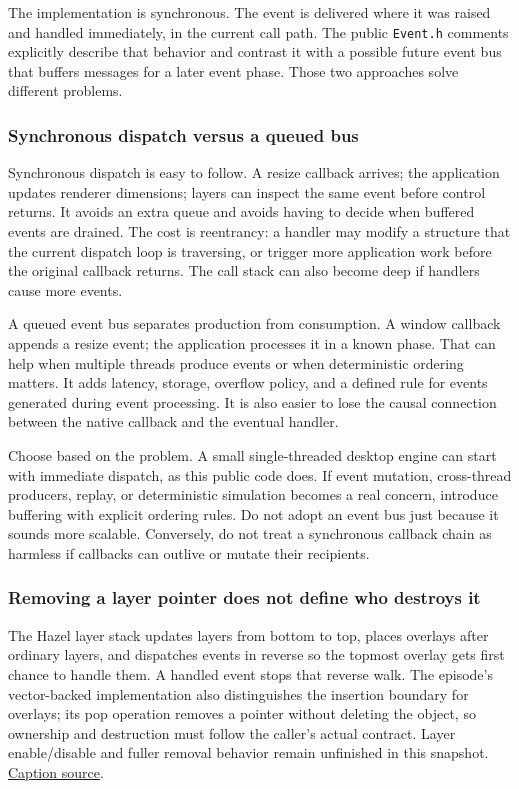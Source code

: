 The implementation is synchronous. The event is delivered where it was raised and handled immediately, in the current call path. The public \texttt{Event.h} comments explicitly describe that behavior and contrast it with a possible future event bus that buffers messages for a later event phase. Those two approaches solve different problems.

\subsubsection{Synchronous dispatch versus a queued bus}\label{05-engine-i-ch013-synchronous-dispatch-versus-a-queued-bus}

Synchronous dispatch is easy to follow. A resize callback arrives; the application updates renderer dimensions; layers can inspect the same event before control returns. It avoids an extra queue and avoids having to decide when buffered events are drained. The cost is reentrancy: a handler may modify a structure that the current dispatch loop is traversing, or trigger more application work before the original callback returns. The call stack can also become deep if handlers cause more events.

A queued event bus separates production from consumption. A window callback appends a resize event; the application processes it in a known phase. That can help when multiple threads produce events or when deterministic ordering matters. It adds latency, storage, overflow policy, and a defined rule for events generated during event processing. It is also easier to lose the causal connection between the native callback and the eventual handler.

Choose based on the problem. A small single-threaded desktop engine can start with immediate dispatch, as this public code does. If event mutation, cross-thread producers, replay, or deterministic simulation becomes a real concern, introduce buffering with explicit ordering rules. Do not adopt an event bus just because it sounds more scalable. Conversely, do not treat a synchronous callback chain as harmless if callbacks can outlive or mutate their recipients.

\subsubsection{Removing a layer pointer does not define who destroys it}\label{05-engine-i-ch013-removing-a-layer-pointer-does-not-define-who-destroys-it}

The Hazel layer stack updates layers from bottom to top, places overlays after ordinary layers, and dispatches events in reverse so the topmost overlay gets first chance to handle them. A handled event stops that reverse walk. The episode's vector-backed implementation also distinguishes the insertion boundary for overlays; its pop operation removes a pointer without deleting the object, so ownership and destruction must follow the caller's actual contract. Layer enable/disable and fuller removal behavior remain unfinished in this snapshot. \href{https://www.youtube.com/watch?v=_Kj6BSfM6P4}{Caption source}.

